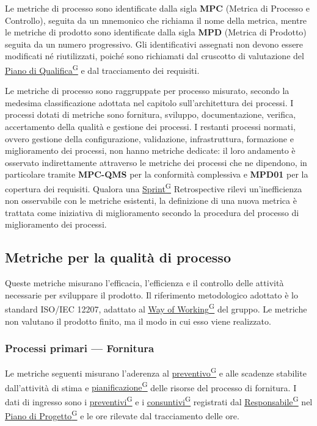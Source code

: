 \documentclass[a4paper,12pt]{article}
\providecommand{\glslink}[2]{\href{https://alittlebyte-19.github.io/Documentazione/glossario.html\#gls-#1}{\underline{#2}\textsuperscript{\scriptsize G}}}
\begin{document}
Le metriche di processo sono identificate dalla sigla \textbf{MPC} (Metrica di Processo e Controllo), seguita da un mnemonico che richiama il nome della metrica, mentre le metriche di prodotto sono identificate dalla sigla \textbf{MPD} (Metrica di Prodotto) seguita da un numero progressivo. Gli identificativi assegnati non devono essere modificati né riutilizzati, poiché sono richiamati dal cruscotto di valutazione del \glslink{piano-di-qualifica}{Piano di Qualifica} e dal tracciamento dei requisiti.

Le metriche di processo sono raggruppate per processo misurato, secondo la medesima classificazione adottata nel capitolo sull'architettura dei processi. I processi dotati di metriche sono fornitura, sviluppo, documentazione, verifica, accertamento della qualità e gestione dei processi. I restanti processi normati, ovvero gestione della configurazione, validazione, infrastruttura, formazione e miglioramento dei processi, non hanno metriche dedicate: il loro andamento è osservato indirettamente attraverso le metriche dei processi che ne dipendono, in particolare tramite \textbf{MPC-QMS} per la conformità complessiva e \textbf{MPD01} per la copertura dei requisiti. Qualora una \glslink{sprint}{Sprint} Retrospective rilevi un'inefficienza non osservabile con le metriche esistenti, la definizione di una nuova metrica è trattata come iniziativa di miglioramento secondo la procedura del processo di miglioramento dei processi.

\subsection{Metriche per la qualità di processo}
Queste metriche misurano l'efficacia, l'efficienza e il controllo delle attività necessarie per sviluppare il prodotto. Il riferimento metodologico adottato è lo standard ISO/IEC 12207, adattato al \glslink{way-of-working-wow}{Way of Working} del gruppo. Le metriche non valutano il prodotto finito, ma il modo in cui esso viene realizzato.

\subsubsection{Processi primari --- Fornitura}
Le metriche seguenti misurano l'aderenza al \glslink{preventivo}{preventivo} e alle scadenze stabilite dall'attività di stima e \glslink{pianificazione}{pianificazione} delle risorse del processo di fornitura. I dati di ingresso sono i \glslink{preventivo}{preventivi} e i \glslink{consuntivo}{consuntivi} registrati dal \glslink{responsabile}{Responsabile} nel \glslink{piano-di-progetto}{Piano di Progetto} e le ore rilevate dal tracciamento delle ore.
\end{document}
